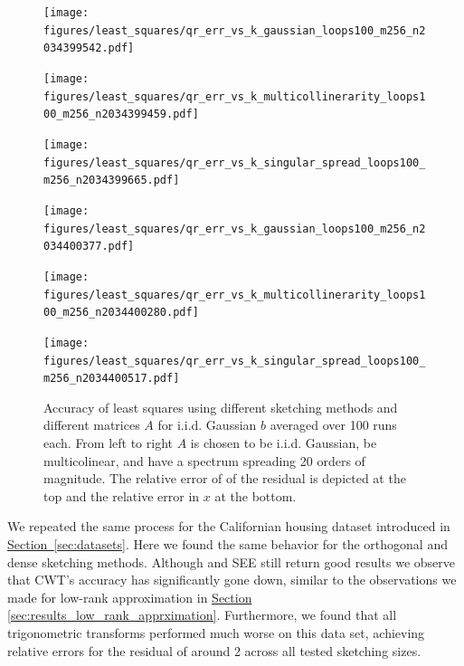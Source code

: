 \documentclass{article}
\begin{document}
\begin{figure}[htb]
  \centering
  \begin{minipage}[t]{.32\linewidth}
    \centering
    \texttt{[image: figures/least\_squares/qr\_err\_vs\_k\_gaussian\_loops100\_m256\_n2034399542.pdf]}
  \end{minipage}
  \begin{minipage}[t]{.32\linewidth}
    \centering
    \texttt{[image: figures/least\_squares/qr\_err\_vs\_k\_multicollinerarity\_loops100\_m256\_n2034399459.pdf]}
  \end{minipage}
  \begin{minipage}[t]{.32\linewidth}
    \centering
    \texttt{[image: figures/least\_squares/qr\_err\_vs\_k\_singular\_spread\_loops100\_m256\_n2034399665.pdf]}
  \end{minipage}
  \begin{minipage}[t]{.32\linewidth}
    \centering
    \texttt{[image: figures/least\_squares/qr\_err\_vs\_k\_gaussian\_loops100\_m256\_n2034400377.pdf]}
  \end{minipage}
  \begin{minipage}[t]{.32\linewidth}
    \centering
    \texttt{[image: figures/least\_squares/qr\_err\_vs\_k\_multicollinerarity\_loops100\_m256\_n2034400280.pdf]}
  \end{minipage}
  \begin{minipage}[t]{.32\linewidth}
    \centering
    \texttt{[image: figures/least\_squares/qr\_err\_vs\_k\_singular\_spread\_loops100\_m256\_n2034400517.pdf]}
  \end{minipage}
  \caption{Accuracy of least squares using different sketching methods and different matrices $A$ for i.i.d. Gaussian $b$ averaged over 100 runs each. From left to right $A$ is chosen to be i.i.d. Gaussian, be multicolinear, and have a spectrum spreading 20 orders of magnitude. The relative error of of the residual is depicted at the top and the relative error in $x$ at the bottom.}
  \label{fig:qr_results}
\end{figure}

We repeated the same process for the Californian housing dataset introduced in \hyperref[sec:datasets]{Section~\ref*{sec:datasets}}. Here we found the same behavior for the orthogonal and dense sketching methods. Although and SEE still return good results we observe that CWT's accuracy has significantly gone down, similar to the observations we made for low-rank approximation in \hyperref[sec:results_low_rank_apprximation]{Section \ref*{sec:results_low_rank_apprximation}}. Furthermore, we found that all trigonometric transforms performed much worse on this data set, achieving relative errors for the residual of around 2 across all tested sketching sizes.  
\end{document}
